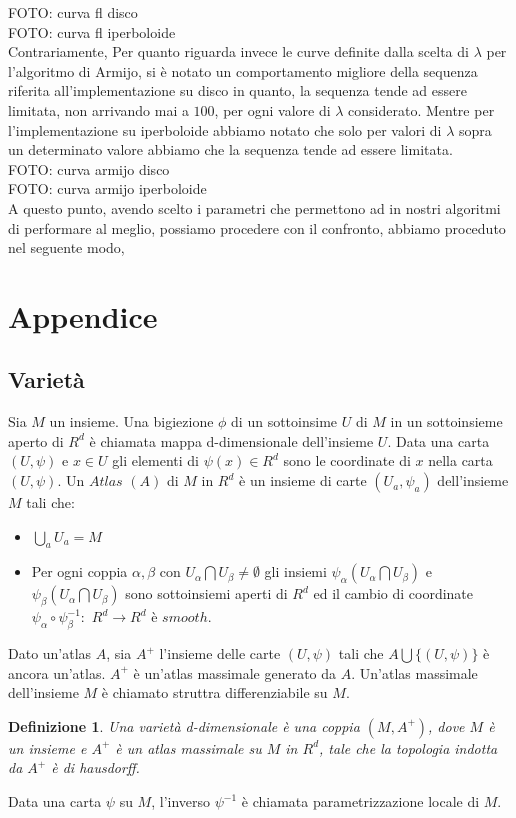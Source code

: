 \documentclass[a4paper, 12pt]{article}
\newtheorem{definition}{Definizione}
\begin{document}
FOTO: curva fl disco \\

FOTO: curva fl iperboloide\\

Contrariamente, Per quanto riguarda invece le curve definite dalla scelta di $\lambda$ per l'algoritmo di Armijo, si è notato un comportamento migliore della sequenza riferita all'implementazione su disco in quanto, la sequenza tende ad essere limitata, non arrivando mai a $100$, per ogni valore di $\lambda$ considerato. Mentre per l'implementazione su iperboloide abbiamo notato che solo per valori di $\lambda$ sopra un determinato valore abbiamo che la sequenza tende ad essere limitata.\\

FOTO: curva armijo disco \\

FOTO: curva armijo iperboloide\\

A questo punto, avendo scelto i parametri che permettono ad in nostri algoritmi di performare al meglio, possiamo procedere con il confronto, abbiamo proceduto nel seguente modo,
\section{Appendice}
\subsection{Varietà}
Sia $M$ un insieme. Una bigiezione $\phi$ di un sottoinsime $U$ di $M$ in un sottoinsieme aperto di $R^d$ è chiamata mappa d-dimensionale dell'insieme $U$. Data una carta $(U, \psi)$ e $x \in U$ gli elementi di $\psi(x) \in R^d$ sono le coordinate di $x$ nella carta $(U, \psi)$. Un $Atlas$ $(A)$ di $M$ in $R^d$ è un insieme di carte $(U_a, \psi_a)$ dell'insieme $M$ tali che:
\begin{itemize}
    \item $\bigcup_a U_a = M$
    \item Per ogni coppia $\alpha, \beta$ con $U_{\alpha} \bigcap U_{\beta} \neq \emptyset$ gli insiemi $\psi_{\alpha}(U_{\alpha} \bigcap U_{\beta})$ e $\psi_{\beta}(U_{\alpha} \bigcap U_{\beta})$ sono sottoinsiemi aperti di $R^d$ ed il cambio di coordinate $\psi_{\alpha} \circ \psi_{\beta}^{-1}:$ $R^d \to R^d$ è $smooth$.
\end{itemize}
Dato un'atlas $A$, sia $A^+$ l'insieme delle carte $(U, \psi)$ tali che $A \bigcup \{(U, \psi)\}$ è ancora un'atlas. $A^+$ è un'atlas massimale generato da $A$. Un'atlas massimale dell'insieme $M$ è chiamato struttra differenziabile su $M$.
\begin{definition}
Una varietà d-dimensionale è una coppia $(M, A^+)$, dove $M$ è un insieme e $A^+$ è un atlas massimale su $M$ in $R^d$, tale che la topologia indotta da $A^+$ è di hausdorff.
\end{definition}
Data una carta $\psi$ su $M$, l'inverso $\psi^{-1}$ è chiamata parametrizzazione locale di $M$.
\end{document}
